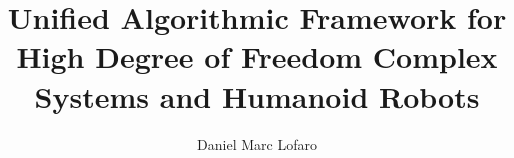 \documentclass[12pt, letterpaper]{drexelthesis}
\author{Daniel Marc Lofaro}
\title{Unified Algorithmic Framework for High Degree of Freedom Complex Systems and Humanoid Robots}
\begin{document}
 



	\doublespacing
	\maketitle 
\begin{preliminary}
	\sloppy
	\copyrightpage
	
	
	
	
	
	
	\mytableofcontents
	\mylistoftables
	\mylistoffigures
	
\end{preliminary}

\begin{thesis}
	\fussy
	
	
	
	
%	
	

	\singlespacing
%	
%	
	
	
%	

	\appendix
	
	
%	
%	
%	
%	
%	
%	
        
\end{thesis}
\end{document}
